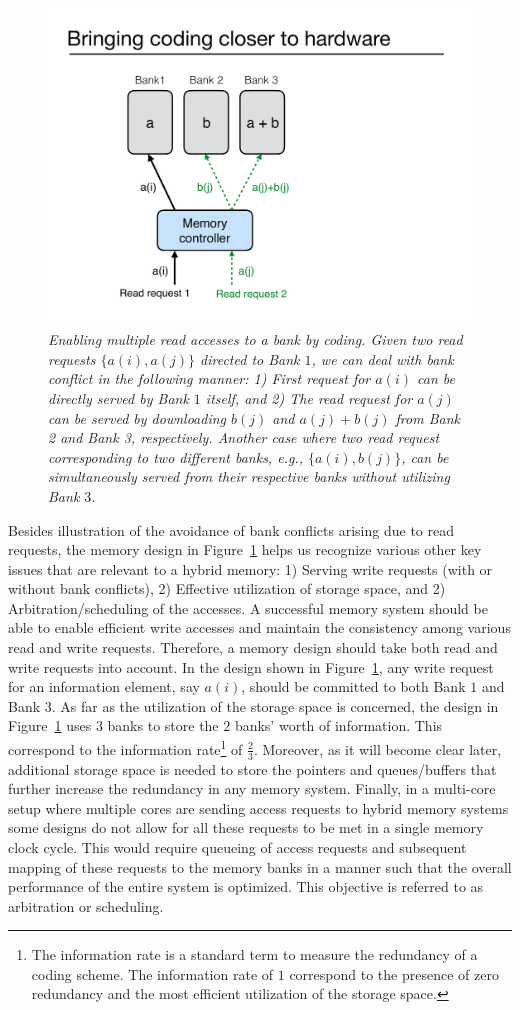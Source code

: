\begin{figure}[t!]
\centering
\includegraphics[width=0.395\linewidth]{fig/example-xor.pdf}
\caption{\it{Enabling multiple read accesses to a bank by coding. Given two read requests $\{a(i), a(j)\}$ directed to Bank $1$, we can deal with bank conflict in the following manner: 1) First request for $a(i)$ can be directly served by Bank $1$ itself, and 2) The read request for $a(j)$ can be served by downloading $b(j)$ and $a(j) + b(j)$ from Bank 2 and Bank 3, respectively. Another case where two read request corresponding to two different banks, e.g., $\{a(i), b(j)\}$, can be simultaneously served from their respective banks without utilizing Bank $3$.}}
\label{fig:example_xor}
\end{figure}
Besides illustration of the avoidance of bank conflicts arising due to read requests, the memory design in Figure~\ref{fig:example_xor} helps us recognize various other key issues that are relevant to a hybrid memory: 1) Serving write requests (with or without bank conflicts), 2) Effective utilization of storage space, and 2) Arbitration/scheduling of the accesses. A successful memory system should be able to enable efficient write accesses and maintain the consistency among various read and write requests. Therefore, a memory design should take both read and write requests into account. In the design shown in Figure~\ref{fig:example_xor}, any write request for an information element, say $a(i)$, should be committed to both Bank $1$ and Bank $3$. As far as the utilization of the storage space is concerned, the design in Figure~\ref{fig:example_xor} uses $3$ banks to store the $2$ banks' worth of information. This correspond to the information rate\footnote{The information rate is a standard term to measure the redundancy of a coding scheme. The information rate of $1$ correspond to the presence of zero redundancy and the most efficient utilization of the storage space.} of $\frac{2}{3}$. Moreover, as it will become clear later, additional storage space is needed to store the pointers and queues/buffers that further increase the redundancy in any memory system. {\color{red}Finally, in a multi-core setup where multiple cores are sending access requests to hybrid memory systems some designs do not allow for all these requests to be met in a single memory clock cycle. This would require queueing of access requests and subsequent mapping of these requests to the memory banks in a manner such that the overall performance of the entire system is optimized. This objective is referred to as arbitration or scheduling.} \\

